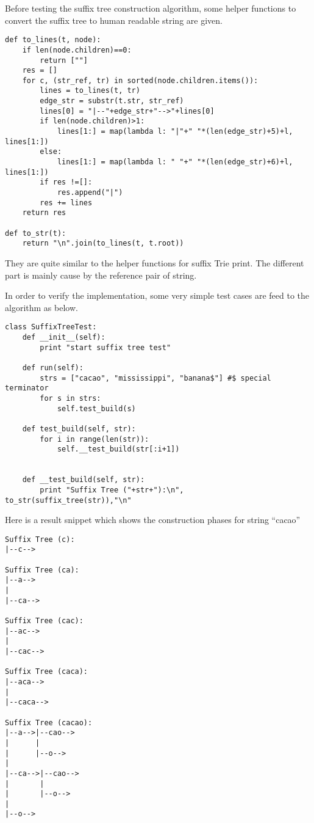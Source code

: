 \documentclass{article}
\begin{document}
Before testing the suffix tree construction algorithm, some helper
functions to convert the suffix tree to human readable string are
given.

\begin{lstlisting}
def to_lines(t, node):
    if len(node.children)==0:
        return [""]
    res = []
    for c, (str_ref, tr) in sorted(node.children.items()):
        lines = to_lines(t, tr)
        edge_str = substr(t.str, str_ref)
        lines[0] = "|--"+edge_str+"-->"+lines[0]
        if len(node.children)>1:
            lines[1:] = map(lambda l: "|"+" "*(len(edge_str)+5)+l, lines[1:])
        else:
            lines[1:] = map(lambda l: " "+" "*(len(edge_str)+6)+l, lines[1:])
        if res !=[]:
            res.append("|")
        res += lines
    return res

def to_str(t):
    return "\n".join(to_lines(t, t.root))
\end{lstlisting}

They are quite similar to the helper functions for suffix Trie print. The different
part is mainly cause by the reference pair of string.

In order to verify the implementation, some very simple test cases are feed to the
algorithm as below.

\begin{lstlisting}
class SuffixTreeTest:
    def __init__(self):
        print "start suffix tree test"

    def run(self):
        strs = ["cacao", "mississippi", "banana$"] #$ special terminator
        for s in strs:
            self.test_build(s)

    def test_build(self, str):
        for i in range(len(str)):
            self.__test_build(str[:i+1])


    def __test_build(self, str):
        print "Suffix Tree ("+str+"):\n", to_str(suffix_tree(str)),"\n"
\end{lstlisting}

Here is a result snippet which shows the construction phases for string ``cacao''

\begin{verbatim}
Suffix Tree (c):
|--c--> 

Suffix Tree (ca):
|--a-->
|
|--ca--> 

Suffix Tree (cac):
|--ac-->
|
|--cac--> 

Suffix Tree (caca):
|--aca-->
|
|--caca--> 

Suffix Tree (cacao):
|--a-->|--cao-->
|      |
|      |--o-->
|
|--ca-->|--cao-->
|       |
|       |--o-->
|
|--o--> 
\end{verbatim}
\end{document}
